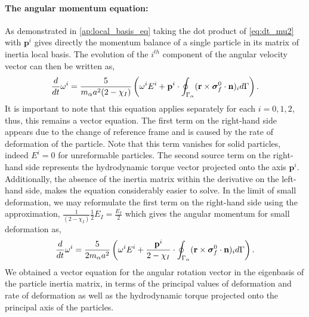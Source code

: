 \paragraph*{The angular momentum equation:}
As demonstrated in \ref{ap:local_basis_eq} taking the dot product of \ref{eq:dt_mu2} with $\textbf{p}^i$ gives directly the momentum balance of a single particle in its matrix of inertia local basis. 
The evolution of the $i^{th}$ component of the angular velocity vector can then be written as, 
\begin{align*}
    \frac{d}{dt}\omega^i 
    = 
    \frac{5}{m_\alpha a^2 (2 - \chi_I)}
    \left(
    \omega^i E^i 
    +
    \textbf{p}^i\cdot \oint_{\Gamma_{\alpha}} (\textbf{r}\times\bm\sigma_f^0\cdot \textbf{n})_i d\Gamma 
    \right).    
\end{align*}
It is important to note that this equation applies separately for each $i = 0,1,2$, thus, this remains a vector equation. 
The first term on the right-hand side appears due to the change of reference frame and is caused by the rate of deformation of the particle.
Note that this term vanishes for solid particles, indeed $E^i = 0$ for unreformable particles. 
The second source term on the right-hand side represents the hydrodynamic torque vector projected onto the axis $\textbf{p}^i$. 
Additionally, the absence of the inertia matrix within the derivative on the left-hand side, makes the equation considerably easier to solve.
In the limit of small deformation, we may reformulate the first term on the right-hand side using the approximation, 
$
    \frac{1}{(2-\chi_I)} \frac{1}{2} E_I 
    = \frac{E_I}{2}
$
which gives the angular momentum for small deformation as, 
\begin{align*}
    \ddt\omega^i 
    = 
    \frac{5}{ 2 m_\alpha a^2}
    \left(
    \omega^i E^i
    +
    \frac{\textbf{p}^i}{2 - \chi_I}\cdot \intS{(\textbf{r}\times\bm\sigma_f^0\cdot \textbf{n})_i} 
    \right).    
    \label{eq:dt_omega_I}
\end{align*}
We obtained a vector equation for the angular rotation vector in the eigenbasis of the particle inertia matrix, in terms of the principal values of deformation and rate of deformation as well as the hydrodynamic torque projected onto the principal axis of the particles.  




